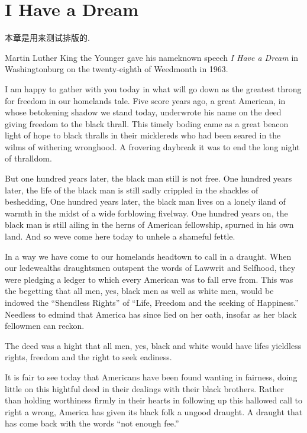 \chapter{I Have a Dream}

\begin{remark*}
    本章是用来测试排版的.
\end{remark*}

\begin{remark*}
    Martin Luther King the Younger gave his nameknown speech
    \textit{I Have a Dream} in Washingtonburg on the twenty-eighth
    of Weedmonth in 1963.
\end{remark*}

I am happy to gather with you today in what will go down as the
greatest throng for freedom in our homeland\textquotesingle{}s
tale. Five score years ago, a great American, in whose betokening
shadow we stand today, underwrote his name on the deed giving
freedom to the black thrall. This timely boding came as a great
beacon light of hope to black thralls in their micklereds who had
been seared in the wilms of withering wronghood. A frovering
daybreak it was to end the long night of thralldom.

But one hundred years later, the black man still is not free. One
hundred years later, the life of the black man is still sadly
crippled in the shackles of beshedding, One hundred years later,
the black man lives on a lonely iland of warmth in the midst of a
wide forblowing fivelway. One hundred years on, the black man is
still ailing in the herns of American fellowship, spurned in his
own land. And so we\textquotesingle{}ve come here today to unhele
a shameful fettle.

In a way we have come to our homeland\textquotesingle{}s headtown
to call in a draught. When our ledewealth\textquotesingle{}s
draughtsmen outspent the words of Lawwrit and Selfhood, they were
pledging a ledger to which every American was to fall erve from.
This was the begetting that all men, yes, black men as well as
white men, would be indowed the ``Shendless Rights'' of ``Life,
Freedom and the seeking of Happiness.'' Needless to edmind that
America has since lied on her oath, insofar as her black fellowmen
can reckon.

The deed was a hight that all men, yes, black and white would have
life\textquotesingle{}s yieldless rights, freedom and the right to
seek eadiness.

It is fair to see today that Americans have been found wanting in
fairness, doing little on this hightful deed in their dealings
with their black brothers. Rather than holding worthiness firmly
in their hearts in following up this hallowed call to right a
wrong, America has given its black folk a ungood draught. A
draught that has come back with the words ``not enough fee.''

